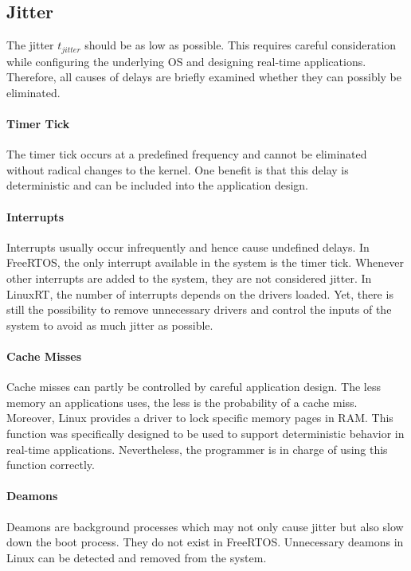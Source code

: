 \subsection{Jitter}
The jitter $ t_{jitter} $ should be as low as possible. 
This requires careful consideration while configuring the underlying \ac{OS} and designing real-time applications.
Therefore, all causes of delays are briefly examined whether they can possibly be eliminated.

\paragraph{Timer Tick} 
The timer tick occurs at a predefined frequency and cannot be eliminated without radical changes to the kernel.
One benefit is that this delay is deterministic and can be included into the application design. 

\paragraph{Interrupts}
Interrupts usually occur infrequently and hence cause undefined delays. 
In FreeRTOS, the only interrupt available in the system is the timer tick.
Whenever other interrupts are added to the system, they are not considered jitter.
In LinuxRT, the number of interrupts depends on the drivers loaded. 
Yet, there is still the possibility to remove unnecessary drivers and control the inputs of the system to avoid as much jitter as possible.

\paragraph{Cache Misses}
Cache misses can partly be controlled by careful application design.
The less memory an applications uses, the less is the probability of a cache miss.
Moreover, Linux provides a driver to lock specific memory pages in \ac{RAM}.
This function was specifically designed to be used to support deterministic behavior in real-time applications.
Nevertheless, the programmer is in charge of using this function correctly.

\paragraph{Deamons}
Deamons are background processes which may not only cause jitter but also slow down the boot process. 
They do not exist in FreeRTOS.
Unnecessary deamons in Linux can be detected and removed from the system.